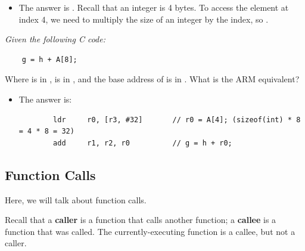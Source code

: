 \documentclass[letterpaper]{article}
\begin{document}
\begin{itemize}
    \item The answer is . Recall that an integer is 4 bytes. To access the element at index 4, we need to multiply the size of an integer by the index, so . 
\end{itemize}

\bigskip 
\bigskip 

\emph{Given the following C code:}
\begin{verbatim}
    g = h + A[8];
\end{verbatim}
Where  is in ,  is in , and the base address of  is in . What is the ARM equivalent? 

\begin{itemize}
    \item The answer is:
    \begin{verbatim}
        ldr     r0, [r3, #32]       // r0 = A[4]; (sizeof(int) * 8 = 4 * 8 = 32)
        add     r1, r2, r0          // g = h + r0; 
    \end{verbatim}
\end{itemize}

\subsection{Function Calls}
Here, we will talk about function calls. 

\bigskip 

Recall that a \textbf{caller} is a function that calls another function; a \textbf{callee} is a function that was called. The currently-executing function is a callee, but not a caller.
\end{document}

